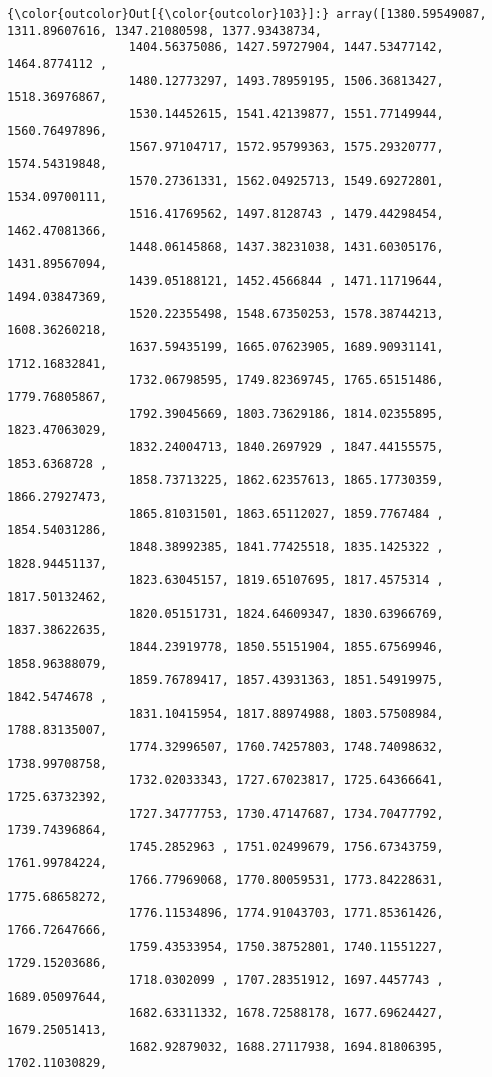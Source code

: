 \documentclass[11pt]{article}
\begin{document}
\begin{Verbatim}[commandchars=\\\{\}]
{\color{outcolor}Out[{\color{outcolor}103}]:} array([1380.59549087, 1311.89607616, 1347.21080598, 1377.93438734,
                 1404.56375086, 1427.59727904, 1447.53477142, 1464.8774112 ,
                 1480.12773297, 1493.78959195, 1506.36813427, 1518.36976867,
                 1530.14452615, 1541.42139877, 1551.77149944, 1560.76497896,
                 1567.97104717, 1572.95799363, 1575.29320777, 1574.54319848,
                 1570.27361331, 1562.04925713, 1549.69272801, 1534.09700111,
                 1516.41769562, 1497.8128743 , 1479.44298454, 1462.47081366,
                 1448.06145868, 1437.38231038, 1431.60305176, 1431.89567094,
                 1439.05188121, 1452.4566844 , 1471.11719644, 1494.03847369,
                 1520.22355498, 1548.67350253, 1578.38744213, 1608.36260218,
                 1637.59435199, 1665.07623905, 1689.90931141, 1712.16832841,
                 1732.06798595, 1749.82369745, 1765.65151486, 1779.76805867,
                 1792.39045669, 1803.73629186, 1814.02355895, 1823.47063029,
                 1832.24004713, 1840.2697929 , 1847.44155575, 1853.6368728 ,
                 1858.73713225, 1862.62357613, 1865.17730359, 1866.27927473,
                 1865.81031501, 1863.65112027, 1859.7767484 , 1854.54031286,
                 1848.38992385, 1841.77425518, 1835.1425322 , 1828.94451137,
                 1823.63045157, 1819.65107695, 1817.4575314 , 1817.50132462,
                 1820.05151731, 1824.64609347, 1830.63966769, 1837.38622635,
                 1844.23919778, 1850.55151904, 1855.67569946, 1858.96388079,
                 1859.76789417, 1857.43931363, 1851.54919975, 1842.5474678 ,
                 1831.10415954, 1817.88974988, 1803.57508984, 1788.83135007,
                 1774.32996507, 1760.74257803, 1748.74098632, 1738.99708758,
                 1732.02033343, 1727.67023817, 1725.64366641, 1725.63732392,
                 1727.34777753, 1730.47147687, 1734.70477792, 1739.74396864,
                 1745.2852963 , 1751.02499679, 1756.67343759, 1761.99784224,
                 1766.77969068, 1770.80059531, 1773.84228631, 1775.68658272,
                 1776.11534896, 1774.91043703, 1771.85361426, 1766.72647666,
                 1759.43533954, 1750.38752801, 1740.11551227, 1729.15203686,
                 1718.0302099 , 1707.28351912, 1697.4457743 , 1689.05097644,
                 1682.63311332, 1678.72588178, 1677.69624427, 1679.25051413,
                 1682.92879032, 1688.27117938, 1694.81806395, 1702.11030829,

\end{Verbatim}
\end{document}
